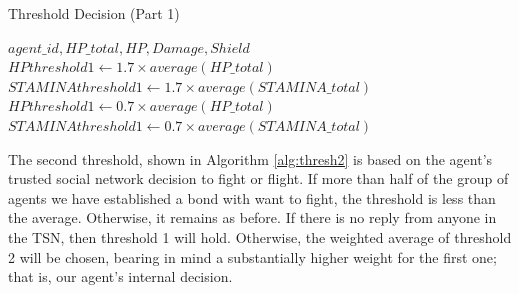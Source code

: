 \begin{algorithm}[htb]
\caption{Threshold Decision (Part 1)}\label{alg:thresh1}
\begin{algorithmic} 
\scriptsize
\Require $agent\_id, HP\_total, HP, Damage, Shield$
\State $HPthreshold1 \leftarrow 1.7 \times average(HP\_total)$
\EndIf
{}
\State $STAMINAthreshold1 \leftarrow 1.7 \times average(STAMINA\_total)$
\EndIf
{}
\State $HPthreshold1 \leftarrow 0.7 \times average(HP\_total)$
\EndIf
{}
\State $STAMINAthreshold1 \leftarrow 0.7 \times average(STAMINA\_total)$
\EndIf
\end{algorithmic}
\end{algorithm}

The second threshold, shown in Algorithm \ref{alg:thresh2} is based on the agent's trusted social network decision to fight or flight. If more than half of the group of agents we have established a bond with want to fight, the threshold is less than the average. Otherwise, it remains as before. If there is no reply from anyone in the TSN, then threshold 1 will hold. Otherwise, the weighted average of threshold 2 will be chosen, bearing in mind a substantially higher weight for the first one; that is, our agent's internal decision.

